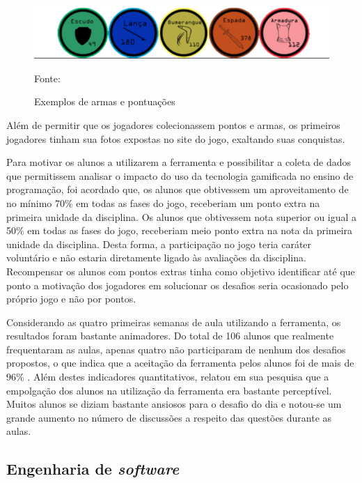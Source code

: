 \begin{figure}[h]
	\centering
	\includegraphics[keepaspectratio=true,scale=0.45]{figuras/armas.png}
	\caption{Exemplos de armas e pontuações}
	Fonte: \cite{raposo2016desafio}
	\label{figura2}
\end{figure}

\pagebreak

Além de permitir que os jogadores colecionassem pontos e armas, os primeiros jogadores tinham sua fotos expostas no
site do jogo, exaltando suas conquistas.

Para motivar os alunos a utilizarem a ferramenta e possibilitar a coleta de dados que permitissem analisar o 
impacto do uso da tecnologia gamificada no ensino de programação, foi acordado que, os alunos que obtivessem 
um aproveitamento de no mínimo 70\% em todas as fases do jogo, receberiam um ponto extra na primeira unidade 
da disciplina. Os alunos que obtivessem nota superior ou igual a 50\% em todas as fases do jogo, receberiam 
meio ponto extra na nota da primeira unidade da disciplina. Desta forma, a participação no jogo teria caráter 
voluntário e não estaria diretamente ligado às avaliações da disciplina. Recompensar os alunos com pontos extras
tinha como objetivo identificar até que ponto a motivação dos jogadores em solucionar os desafios seria ocasionado
pelo próprio jogo e não por pontos.

Considerando as quatro primeiras semanas de aula utilizando a ferramenta, os resultados foram bastante animadores.
Do total de 106 alunos que realmente frequentaram as aulas, apenas quatro não participaram de nenhum dos desafios 
propostos, o que indica que a aceitação da ferramenta pelos alunos foi de mais de 96\% . Além destes indicadores 
quantitativos,  relatou em sua pesquisa que a empolgação dos alunos na utilização da 
ferramenta era bastante perceptível. Muitos alunos se diziam bastante ansiosos para o desafio do dia e notou-se um 
grande aumento no número de discussões a respeito das questões durante as aulas.

\subsection{Engenharia de \textit{software}}

